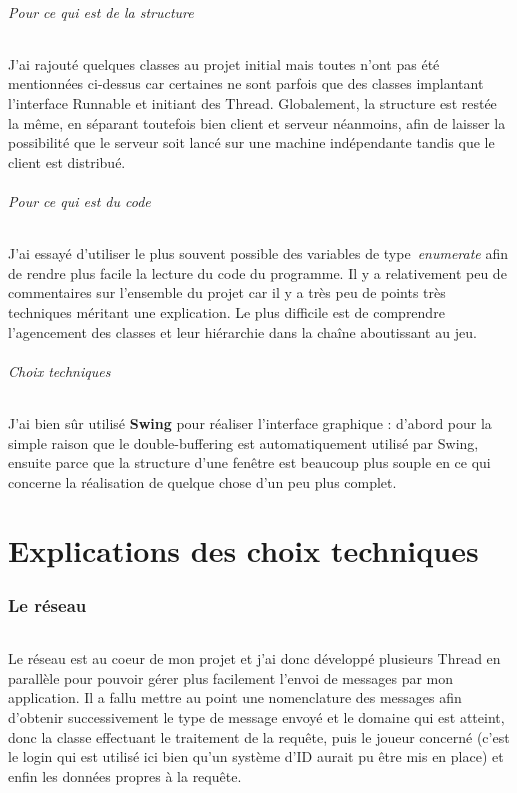 \documentclass[a4paper,12pt]{report}
\begin{document}
\paragraph{Pour ce qui est de la structure}
J'ai rajouté quelques classes au projet initial mais toutes n'ont pas été mentionnées ci-dessus car certaines ne sont parfois que des classes implantant l'interface Runnable et initiant des Thread. Globalement, la structure est restée la même, en séparant toutefois bien client et serveur néanmoins, afin de laisser la possibilité que le serveur soit lancé sur une machine indépendante tandis que le client est distribué.
\paragraph{Pour ce qui est du code}
J'ai essayé d'utiliser le plus souvent possible des variables de type \emph{enumerate} afin de rendre plus facile la lecture du code du programme. Il y a relativement peu de commentaires sur l'ensemble du projet car il y a très peu de points très techniques méritant une explication. Le plus difficile est de comprendre l'agencement des classes et leur hiérarchie dans la chaîne aboutissant au jeu.
\paragraph{Choix techniques}
J'ai bien sûr utilisé \textbf{Swing} pour réaliser l'interface graphique : d'abord pour la simple raison que le double-buffering est automatiquement utilisé par Swing, ensuite parce que la structure d'une fenêtre est beaucoup plus souple en ce qui concerne la réalisation de quelque chose d'un peu plus complet.

\part{Explications des choix techniques}
\section{Le réseau}
\paragraph{}
Le réseau est au coeur de mon projet et j'ai donc développé plusieurs Thread en parallèle pour pouvoir gérer plus facilement l'envoi de messages par mon application.
Il a fallu mettre au point une nomenclature des messages afin d'obtenir successivement le type de message envoyé et le domaine qui est atteint, donc la classe effectuant le traitement de la requête, puis le joueur concerné (c'est le login qui est utilisé ici bien qu'un système d'ID aurait pu être mis en place) et enfin les données propres à la requête.
\end{document}
